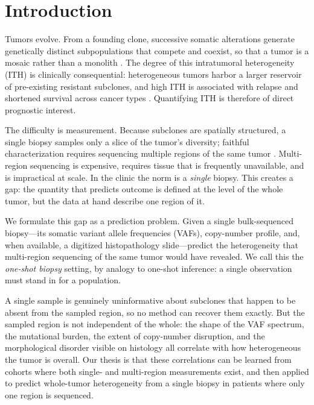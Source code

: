 \documentclass{article}
\begin{document}
\section{Introduction}

Tumors evolve. From a founding clone, successive somatic alterations generate
genetically distinct subpopulations that compete and coexist, so that a tumor is a
mosaic rather than a monolith \citep{Nowell1976,Gerlinger2012}. The degree of this
intratumoral heterogeneity (ITH) is clinically consequential: heterogeneous tumors
harbor a larger reservoir of pre-existing resistant subclones, and high ITH is
associated with relapse and shortened survival across cancer types
\citep{Gerlinger2012,McGranahan2015,Andor2016}. Quantifying ITH is therefore of
direct prognostic interest.

The difficulty is measurement. Because subclones are spatially structured, a single
biopsy samples only a slice of the tumor's diversity; faithful characterization
requires sequencing multiple regions of the same tumor
\citep{Gerlinger2012,Yates2015}. Multi-region sequencing is expensive, requires
tissue that is frequently unavailable, and is impractical at scale. In the clinic
the norm is a \emph{single} biopsy. This creates a gap: the quantity that predicts
outcome is defined at the level of the whole tumor, but the data at hand describe
one region of it.

We formulate this gap as a prediction problem. Given a single bulk-sequenced
biopsy---its somatic variant allele frequencies (VAFs), copy-number profile, and,
when available, a digitized histopathology slide---predict the heterogeneity that
multi-region sequencing of the same tumor would have revealed. We call this the
\emph{one-shot biopsy} setting, by analogy to one-shot inference: a single
observation must stand in for a population.

A single sample is genuinely uninformative about subclones that happen to be absent
from the sampled region, so no method can recover them exactly. But the sampled
region is not independent of the whole: the shape of the VAF spectrum, the
mutational burden, the extent of copy-number disruption, and the morphological
disorder visible on histology all correlate with how heterogeneous the tumor is
overall. Our thesis is that these correlations can be learned from cohorts where
both single- and multi-region measurements exist, and then applied to predict
whole-tumor heterogeneity from a single biopsy in patients where only one region is
sequenced.
\end{document}
